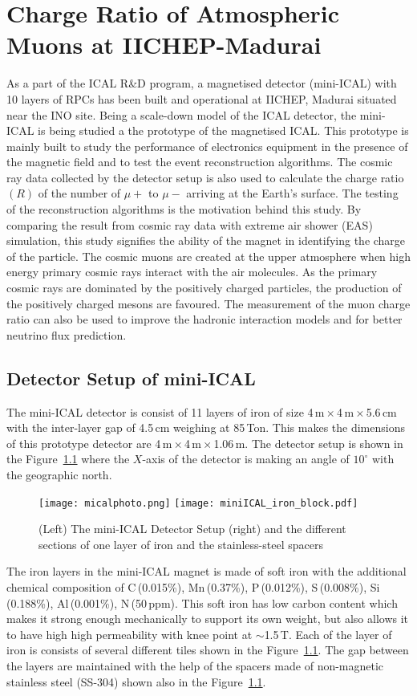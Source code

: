 
\chapter{Charge Ratio of Atmospheric Muons at IICHEP-Madurai}

As a part of the ICAL R\&D program, a magnetised detector (mini-ICAL)
with 10 layers of RPCs has been built and operational at IICHEP,
Madurai situated near the INO site. Being a scale-down model of the
ICAL detector, the mini-ICAL is being studied a the prototype of
the magnetised ICAL. This prototype is mainly built to study the
performance of electronics equipment in the presence of the magnetic
field and to test the event reconstruction algorithms.
The cosmic ray data collected by the
detector setup is also used to calculate the charge ratio $(R)$
of the number of $\mu+$ to $\mu-$ arriving at the Earth's surface.
The testing of the reconstruction algorithms is the motivation behind
this study. By comparing the result from cosmic ray data with extreme
air shower (EAS) simulation, this study signifies the ability of
the magnet in identifying the charge of the particle.
The cosmic muons are created at the upper atmosphere when high energy
primary cosmic rays interact with the air molecules.
As the primary cosmic rays are dominated by the positively charged
particles, the production of the positively charged mesons are
favoured. The measurement of the muon charge ratio can also be used
to improve the hadronic interaction models and for better neutrino
flux prediction.

\section{Detector Setup of mini-ICAL}
The mini-ICAL detector is consist of 11 layers of iron of size
4\,m\,$\times$\,4\,m\,$\times$\,5.6\,cm with the inter-layer gap
of 4.5\,cm weighing at 85\,Ton. This makes the dimensions of this
prototype detector are 4\,m\,$\times$\,4\,m\,$\times$\,1.06\,m.
The detector setup is shown in the Figure~\ref{fig:miniICAL_iron}
where the $X$-axis of the detector is making an angle of $10^\circ$
with the geographic north.
\begin{figure}[h]
  \centering
  \texttt{[image: micalphoto.png]} 
  \texttt{[image: miniICAL\_iron\_block.pdf]} 
  \caption{(Left) The mini-ICAL Detector Setup (right) and the different
    sections of one layer of iron and the stainless-steel spacers}
  \label{fig:miniICAL_iron}
\end{figure}
The iron layers in the mini-ICAL magnet is made of soft iron with
the additional chemical composition of C\,(0.015\%), Mn\,(0.37\%),
P\,(0.012\%), S\,(0.008\%), Si\,(0.188\%), Al\,(0.001\%), N\,(50\,ppm).
This soft iron has low carbon content which makes it strong enough
mechanically to support its own weight, but also allows it to have high
high permeability with knee point at $\sim$1.5\,T.
Each of the layer of iron is consists of several different tiles shown
in the Figure~\ref{fig:miniICAL_iron}.
The gap between the layers are maintained with the help of the spacers
made of non-magnetic stainless steel (SS-304) shown also in the
Figure~\ref{fig:miniICAL_iron}.

